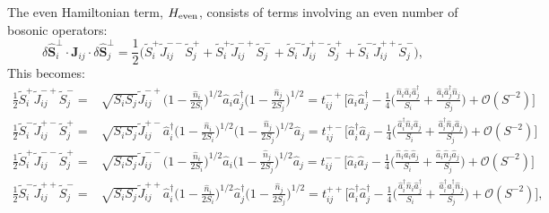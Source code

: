 The even Hamiltonian term, $H_{\rm even}$, consists of terms involving an even number of bosonic operators: 
\begin{equation}
    \delta \hat{\mathbf{S}}_{i}^{\perp} \cdot \mathbf{J}_{ij} \cdot \delta \hat{\mathbf{S}}_{j}^{\perp}  
    = \frac{1}{2} \Big( \widetilde{S}_{i}^{+} \widetilde{J}_{ij}^{--} \widetilde{S}_{j}^{+}  
    + \widetilde{S}_{i}^{+} \widetilde{J}_{ij}^{-+} \widetilde{S}_{j}^{-}
    + \widetilde{S}_{i}^{-} \widetilde{J}_{ij}^{+-} \widetilde{S}_{j}^{+} 
    + \widetilde{S}_{i}^{-} \widetilde{J}_{ij}^{++} \widetilde{S}_{j}^{-} \Big),
\end{equation}
This becomes:
\begin{align*}
    \frac{1}{2} \widetilde{S}_{i}^{+} \widetilde{J}_{ij}^{-+} \widetilde{S}_{j}^{-} 
    = & 
    \sqrt{S_{i}S_{j}} \widetilde{J}_{ij}^{-+} \Big( 1 - \frac{\hat{n}_{i}}{2S_i} \Big)^{1/2} \hat{a}_{i} \hat{a}_{j}^{\dagger}  \Big( 1 - \frac{\hat{n}_{j}}{2S_j} \Big)^{1/2} 
    = t_{ij}^{-+} \Big[ \hat{a}_{i} \hat{a}_{j}^{\dagger}  - \tfrac{1}{4} \Big( \tfrac{\hat{n}_{i} \hat{a}_{i} \hat{a}_{j}^{\dagger}}{S_{i}} + \tfrac{\hat{a}_{i} \hat{a}_{j}^{\dagger} \hat{n}_{j}}{S_{j}} \Big) + \mathcal{O} (S^{-2}) \Big]
    \\
    \frac{1}{2} \widetilde{S}_{i}^{-} \widetilde{J}_{ij}^{+-} \widetilde{S}_{j}^{+} = &
    \sqrt{S_i S_j} \widetilde{J}_{ij}^{+-} \hat{a}_i^{\dagger} \Big( 1 - \frac{\hat{n}_i}{2 S_i} \Big)^{1/2} \Big( 1 - \frac{\hat{n}_j}{2 S_j} \Big)^{1/2} \hat{a}_j 
    = t_{ij}^{+-} \Big[ \hat{a}_{i}^{\dagger} \hat{a}_{j}  - \tfrac{1}{4} \Big( \tfrac{\hat{a}_{i}^{\dagger} \hat{n}_{i} \hat{a}_{j}}{S_{i}} + \tfrac{\hat{a}_{i}^{\dagger} \hat{n}_{j} \hat{a}_{j}}{S_{j}} \Big) + \mathcal{O} (S^{-2}) \Big]
    \\
    \frac{1}{2} \widetilde{S}_{i}^{+} \widetilde{J}_{ij}^{--} \widetilde{S}_{j}^{+} = & 
    \sqrt{S_i S_j} \widetilde{J}_{ij}^{--} \Big( 1 - \frac{\hat{n}_i}{2 S_i} \Big)^{1/2} \hat{a}_i \Big( 1 - \frac{\hat{n}_j}{2 S_j} \Big)^{1/2} \hat{a}_j 
    = t_{ij}^{--} \Big[ \hat{a}_{i} \hat{a}_{j} - \tfrac{1}{4} \Big( \tfrac{\hat{n}_{i} \hat{a}_{i} \hat{a}_{j}}{S_{i}} + \tfrac{\hat{a}_{i} \hat{n}_{j} \hat{a}_{j}}{S_{j}} \Big) + \mathcal{O} (S^{-2}) \Big]
    \\
    \frac{1}{2} \widetilde{S}_{i}^{-} \widetilde{J}_{ij}^{++} \widetilde{S}_{j}^{-} = & 
    \sqrt{S_i S_j} \widetilde{J}_{ij}^{++} \hat{a}_i^{\dagger} \Big( 1 - \frac{\hat{n}_i}{2 S_i} \Big)^{1/2} \hat{a}_j^{\dagger} \Big( 1 - \frac{\hat{n}_j}{2 S_j} \Big)^{1/2}
    = t_{ij}^{++} \Big[ \hat{a}_{i}^{\dagger} \hat{a}_{j}^{\dagger} - \tfrac{1}{4} \Big( \tfrac{\hat{a}_{i}^{\dagger} \hat{n}_{i} \hat{a}_{j}^{\dagger}}{S_{i}} + \tfrac{\hat{a}_{i}^{\dagger} \hat{a}_{j}^{\dagger} \hat{n}_{j}}{S_{j}} \Big) + \mathcal{O} (S^{-2}) \Big],
\end{align*}

